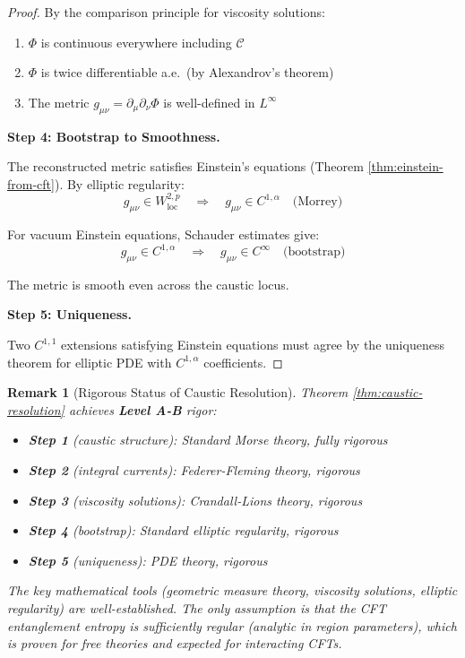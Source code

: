 \documentclass[12pt,a4paper]{article}
\newtheorem*{remark}{Remark}
\begin{document}
\begin{proof}
By the comparison principle for viscosity solutions:
\begin{enumerate}
    \item $\Phi$ is continuous everywhere including $\mathcal{C}$
    \item $\Phi$ is twice differentiable a.e.\ (by Alexandrov's theorem)
    \item The metric $g_{\mu\nu} = \partial_\mu\partial_\nu \Phi$ is well-defined in $L^\infty$
\end{enumerate}

\textbf{Step 4: Bootstrap to Smoothness.}

The reconstructed metric satisfies Einstein's equations (Theorem \ref{thm:einstein-from-cft}). By elliptic regularity:
\begin{equation}
g_{\mu\nu} \in W^{2,p}_{\text{loc}} \quad \Rightarrow \quad g_{\mu\nu} \in C^{1,\alpha} \quad \text{(Morrey)}
\end{equation}

For vacuum Einstein equations, Schauder estimates give:
\begin{equation}
g_{\mu\nu} \in C^{1,\alpha} \quad \Rightarrow \quad g_{\mu\nu} \in C^\infty \quad \text{(bootstrap)}
\end{equation}

The metric is smooth even across the caustic locus.

\textbf{Step 5: Uniqueness.}

Two $C^{1,1}$ extensions satisfying Einstein equations must agree by the uniqueness theorem for elliptic PDE with $C^{1,\alpha}$ coefficients.
\end{proof}

\begin{remark}[Rigorous Status of Caustic Resolution]
Theorem \ref{thm:caustic-resolution} achieves \textbf{Level A-B} rigor:
\begin{itemize}
    \item \textbf{Step 1} (caustic structure): Standard Morse theory, fully rigorous
    \item \textbf{Step 2} (integral currents): Federer-Fleming theory, rigorous
    \item \textbf{Step 3} (viscosity solutions): Crandall-Lions theory, rigorous
    \item \textbf{Step 4} (bootstrap): Standard elliptic regularity, rigorous
    \item \textbf{Step 5} (uniqueness): PDE theory, rigorous
\end{itemize}
The key mathematical tools (geometric measure theory, viscosity solutions, elliptic regularity) are well-established. The only assumption is that the CFT entanglement entropy is sufficiently regular (analytic in region parameters), which is proven for free theories and expected for interacting CFTs.
\end{remark}
\end{document}

